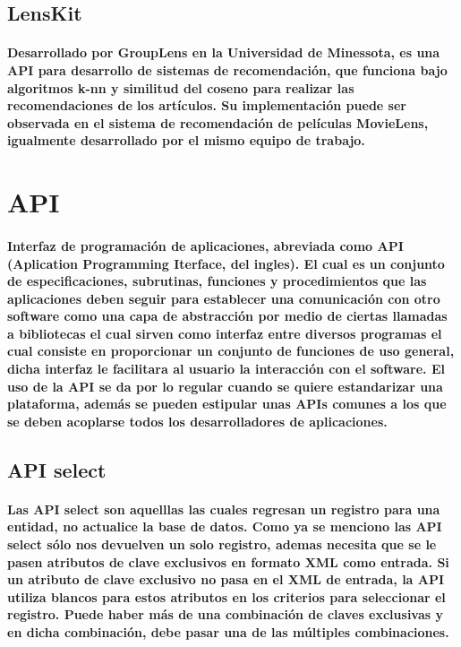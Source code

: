   \subsection{LensKit}
    \paragraph{Desarrollado por GroupLens en la Universidad de Minessota, es una API para desarrollo de sistemas de recomendación, que funciona bajo algoritmos k-nn y similitud del coseno para realizar las recomendaciones de los artículos. Su implementación puede ser observada en el sistema de recomendación de películas MovieLens, igualmente desarrollado por el mismo equipo de trabajo.}
 \newpage
\section{API}
  \paragraph{Interfaz de programación de aplicaciones, abreviada como API (Aplication Programming Iterface, del ingles). El cual es un conjunto de especificaciones, subrutinas, funciones y procedimientos que las aplicaciones deben seguir para establecer una comunicación con otro software como una capa de abstracción por medio de ciertas llamadas a bibliotecas el cual sirven como interfaz entre diversos programas el cual consiste en proporcionar un conjunto de funciones de uso general, dicha interfaz le facilitara al usuario la interacción con el software. El uso de la API se da por lo regular cuando se quiere estandarizar una plataforma, además se pueden estipular unas APIs comunes a los que se deben acoplarse todos los desarrolladores de aplicaciones. }
  
  \subsection{API select}
    \paragraph{Las API select son aquelllas las cuales regresan un registro para una entidad, no actualice la base de datos. Como ya se menciono las API select sólo nos devuelven un solo registro, ademas necesita que se le pasen atributos de clave exclusivos en formato XML como entrada. Si un atributo de clave exclusivo no pasa en el XML de entrada, la API utiliza blancos para estos atributos en los criterios para seleccionar el registro. Puede haber más de una combinación de claves exclusivas y en dicha combinación, debe pasar una de las múltiples combinaciones. }

